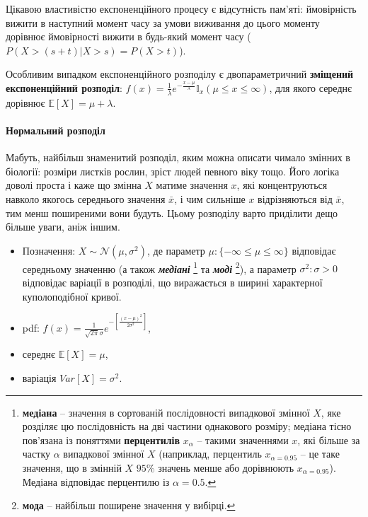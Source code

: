 \documentclass[
  11pt,
]{book}
\begin{document}
Цікавою властивістю експоненційного процесу є відсутність пам'яті: ймовірність вижити в наступний момент часу за умови виживання до цього моменту дорівнює ймовірності вижити в будь-який момент часу (\(P(X > (s+t)|X > s) = P(X > t)\)).

Особливим випадком експоненційного розподілу є двопараметричний \textbf{зміщений експоненційний розподіл}: \(f(x) = \frac{1}{\lambda} e^{-\frac{x - \mu}{\lambda}} \mathbb{I}_x (\mu \leq x \leq \infty)\), для якого середнє дорівнює \(\mathbb{E}[X] = \mu + \lambda\).

\paragraph{Нормальний розподіл}\label{ux43dux43eux440ux43cux430ux43bux44cux43dux438ux439-ux440ux43eux437ux43fux43eux434ux456ux43b}

Мабуть, найбільш знаменитий розподіл, яким можна описати чимало змінних в біології: розміри листків рослин, зріст людей певного віку тощо. Його логіка доволі проста і каже що змінна \(X\) матиме значення \(x\), які концентруються навколо якогось середнього значення \(\bar{x}\), і чим сильніше \(x\) відрізняються від \(\bar{x}\), тим менш поширеними вони будуть. Цьому розподілу варто приділити дещо більше уваги, аніж іншим.

\begin{itemize}
\item
  Позначення: \(X \sim \mathcal{N}(\mu, \sigma^2)\), де параметр \(\mu: \{-\infty \leq \mu \leq \infty\}\) відповідає середньому значенню (а також \textbf{\emph{медіані}} \footnote{\textbf{медіана} -- значення в сортованій послідовності випадкової змінної \(X\), яке розділяє цю послідовність на дві частини однакового розміру; медіана тісно пов'язана із поняттями \textbf{перцентилів} \(x_{\alpha}\) -- такими значеннями \(x\), які більше за частку \(\alpha\) випадкової змінної \(X\) (наприклад, перцентиль \(x_{\alpha = 0.95}\) -- це таке значення, що в змінній \(X\) \(95 \%\) значень менше або дорівнюють \(x_{\alpha = 0.95}\)). Медіана відповідає перцентилю із \(\alpha = 0.5\).} та \textbf{\emph{моді}} \footnote{\textbf{мода} -- найбільш поширене значення у вибірці.}), а параметр \(\sigma^2: \sigma > 0\) відповідає варіації в розподілі, що виражається в ширині характерної куполоподібної кривої.
\item
  pdf: \(f(x) = \frac{1}{\sqrt{2 \pi} \sigma} e^{-\left[ \frac{(x - \mu)^2}{2 \sigma^2} \right]}\),
\item
  середнє \(\mathbb{E} [X] = \mu\),
\item
  варіація \(Var[X] = \sigma^2\).
\end{itemize}
\end{document}
